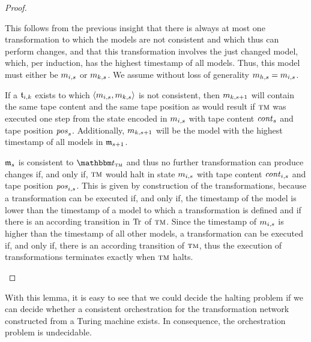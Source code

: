 \begin{proof}
\begin{longenumerate}
            This follows from the previous insight that there is always at most one transformation to which the models are not consistent and which thus can perform changes, and that this transformation involves the just changed model, which, per induction, has the highest timestamp of all models.
            Thus, this model must either be $\model{m}{i,s}$ or $\model{m}{k,s}$.
            We assume without loss of generality $\model{m}{h,s} = \model{m}{i,s}$.            
		 \item
            If a $\transformation{t}_{i,k}$ exists to which $\tupled{\model{m}{i,s},\model{m}{k,s}}$ is not consistent, then $\model{m}{k,s+1}$ %
            will contain the same tape content and the same tape position as would result if $\textsc{tm}$ was executed one step from the state encoded in $\model{m}{i,s}$ with tape content $\mathit{cont}_s$ and tape position $\mathit{pos}_s$.
		 	Additionally, $\model{m}{k,s+1}$ will be the model with the highest timestamp of all models in $\modeltuple{m}_{s+1}$.
		 \item 
             $\modeltuple{m}_{s}$ is consistent to $\transformationset{T}_{\TuringMachine}$ and thus no further transformation can produce changes if, and only if, $\textsc{tm}$ would halt in state $\model{m}{i,s}$ with tape content $\mathit{cont}_{i,s}$ and tape position $\mathit{pos}_{i,s}$.
             This is given by construction of the transformations, because a transformation can be executed if, and only if, the timestamp of the model is lower than the timestamp of a model to which a transformation is defined and if there is an according transition in $\operatorname{Tr}$ of $\textsc{tm}$.
             Since the timestamp of $\model{m}{i,s}$ is higher than the timestamp of all other models, a transformation can be executed if, and only if, there is an according transition of $\textsc{tm}$, thus the execution of transformations terminates exactly when $\textsc{tm}$ halts.
		 	\qedhere
	\end{longenumerate}
\end{proof}

With this lemma, it is easy to see that we could decide the halting problem if we can decide whether a consistent orchestration for the transformation network constructed from a Turing machine exists.
In consequence, the orchestration problem is undecidable.

